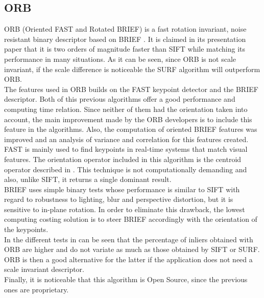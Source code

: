 \subsection{ORB}
ORB (Oriented FAST and Rotated BRIEF) is a fast rotation invariant, noise resistant binary descriptor based on BRIEF \cite{orb}.
It is claimed in its presentation paper that it is two orders of magnitude faster than SIFT while matching its performance in many situations. As it can be seen, since ORB is not scale invariant, if the scale difference is noticeable the SURF algorithm will outperform ORB. 
\\

The features used in ORB builds on the FAST\cite{fast} keypoint detector and the BRIEF\cite{brief} descriptor. Both of this previous algorithms offer a good performance and computing time relation. Since neither of them had the orientation taken into account, the main improvement made by the ORB developers is to include this feature in the algorithms. Also, the computation of oriented BRIEF features was improved and an analysis of variance and correlation for this features created. 
\\

FAST is mainly used to find keypoints in real-time systems that match visual features. The orientation operator included in this algorithm is the centroid operator described in \cite{orientation_corners}. This technique is not computationally demanding and also, unlike SIFT, it returns a single dominant result. 
\\

BRIEF uses simple binary tests whose performance is similar to SIFT with regard to robustness to lighting, blur and perspective distortion, but it is sensitive to in-plane rotation. In order to eliminate this drawback, the lowest computing costing solution is to steer BRIEF accordingly with the orientation of the keypoints. 
\\

In the different tests in \cite{orb} can be seen that the percentage of inliers obtained with ORB are higher and do not variate as much as those obtained by SIFT or SURF. 
ORB is then a good alternative for the latter if the application does not need a scale invariant descriptor. 
\\

Finally, it is noticeable that this algorithm is Open Source, since the previous ones are proprietary. 
